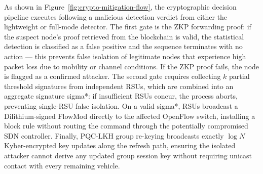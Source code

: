 \documentclass[12pt, a4paper]{report}
\begin{document}
As shown in Figure~\ref{fig:crypto-mitigation-flow}, the cryptographic decision pipeline executes following a malicious detection verdict from either the lightweight or full-mode detector. The first gate is the ZKP forwarding proof: if the suspect node's proof retrieved from the blockchain is valid, the statistical detection is classified as a false positive and the sequence terminates with no action — this prevents false isolation of legitimate nodes that experience high packet loss due to mobility or channel conditions. If the ZKP proof fails, the node is flagged as a confirmed attacker. The second gate requires collecting $k$ partial threshold signatures from independent RSUs, which are combined into an aggregate signature sigma*: if insufficient RSUs concur, the process aborts, preventing single-RSU false isolation. On a valid sigma*, RSUs broadcast a Dilithium-signed FlowMod directly to the affected OpenFlow switch, installing a block rule without routing the command through the potentially compromised SDN controller. Finally, PQC-LKH group re-keying broadcasts exactly $\log N$ Kyber-encrypted key updates along the refresh path, ensuring the isolated attacker cannot derive any updated group session key without requiring unicast contact with every remaining vehicle.
\end{document}
